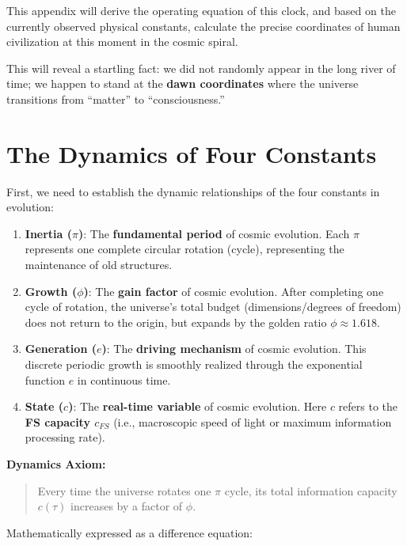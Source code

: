 \documentclass[11pt,a4paper,twoside]{book}
\begin{document}
This appendix will derive the operating equation of this clock, and based on the currently observed physical constants, calculate the precise coordinates of human civilization at this moment in the cosmic spiral.

This will reveal a startling fact: we did not randomly appear in the long river of time; we happen to stand at the \textbf{dawn coordinates} where the universe transitions from ``matter'' to ``consciousness.''

\section{The Dynamics of Four Constants}

First, we need to establish the dynamic relationships of the four constants in evolution:

\begin{enumerate}
\item \textbf{Inertia ($\pi$)}: The \textbf{fundamental period} of cosmic evolution. Each $\pi$ represents one complete circular rotation (cycle), representing the maintenance of old structures.

\item \textbf{Growth ($\phi$)}: The \textbf{gain factor} of cosmic evolution. After completing one cycle of rotation, the universe's total budget (dimensions/degrees of freedom) does not return to the origin, but expands by the golden ratio $\phi \approx 1.618$.

\item \textbf{Generation ($e$)}: The \textbf{driving mechanism} of cosmic evolution. This discrete periodic growth is smoothly realized through the exponential function $e$ in continuous time.

\item \textbf{State ($c$)}: The \textbf{real-time variable} of cosmic evolution. Here $c$ refers to the \textbf{FS capacity $c_{FS}$} (i.e., macroscopic speed of light or maximum information processing rate).
\end{enumerate}

\textbf{Dynamics Axiom:}

\begin{quote}
Every time the universe rotates one $\pi$ cycle, its total information capacity $c(\tau)$ increases by a factor of $\phi$.
\end{quote}

Mathematically expressed as a difference equation:
\end{document}
